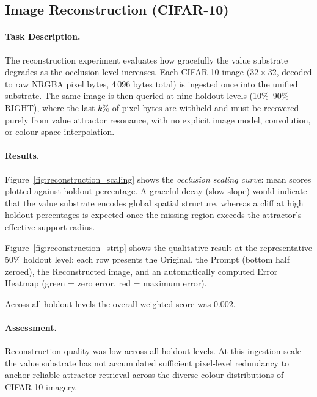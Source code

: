 \subsection{Image Reconstruction (CIFAR-10)}
\label{sec:reconstruction}

\paragraph{Task Description.}
The reconstruction experiment evaluates how gracefully the value substrate
degrades as the occlusion level increases.
Each CIFAR-10 image ($32 \times 32$, decoded to raw NRGBA pixel bytes,
4\,096 bytes total) is ingested once into the unified substrate.
The same image is then queried at nine holdout levels (10\%--90\% RIGHT),
where the last $k$\% of pixel bytes are withheld and must be recovered
purely from value attractor resonance, with no explicit image model,
convolution, or colour-space interpolation.

\paragraph{Results.}
Figure~\ref{fig:reconstruction_scaling} shows the \emph{occlusion scaling
curve}: mean scores plotted against holdout percentage.
A graceful decay (slow slope) would indicate that the value substrate
encodes global spatial structure, whereas a cliff at high holdout
percentages is expected once the missing region exceeds the attractor's
effective support radius.

Figure~\ref{fig:reconstruction_strip} shows the qualitative result at the
representative 50\% holdout level: each row presents the Original, the
Prompt (bottom half zeroed), the Reconstructed image, and an automatically
computed Error Heatmap (green = zero error, red = maximum error).

Across all holdout levels the overall weighted score was 0.002.

\paragraph{Assessment.}
Reconstruction quality was low across all holdout levels.  At this ingestion
scale the value substrate has not accumulated sufficient pixel-level
redundancy to anchor reliable attractor retrieval across the diverse
colour distributions of CIFAR-10 imagery.
